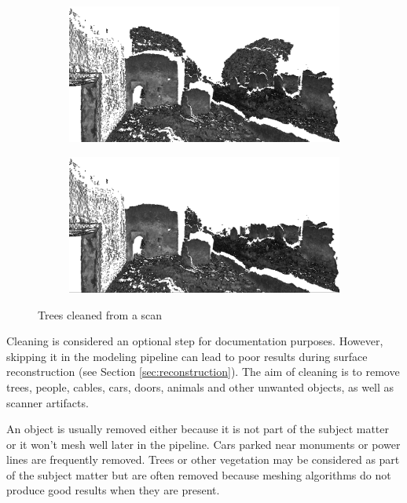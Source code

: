 \begin{figure}[ht]
	\begin{subfigure}[b]{.5\textwidth}
	  \centering
	  \includegraphics[width=.9\linewidth]{images/dirty}
	\end{subfigure}%
	\begin{subfigure}[b]{.5\textwidth}
	  \centering
	  \includegraphics[width=.9\linewidth]{images/clean}
	\end{subfigure}
  \caption{Trees cleaned from a scan}
  \label{fig:cleaning}
\end{figure}

Cleaning is considered an optional step for documentation purposes. However, skipping it in the modeling pipeline can lead to poor results during surface reconstruction (see Section \ref{sec:reconstruction}). The aim of cleaning is to remove trees, people, cables, cars, doors, animals and other unwanted objects, as well as scanner artifacts.

An object is usually removed either because it is not part of the subject matter or it won't mesh well later in the pipeline. Cars parked near monuments or power lines are frequently removed. Trees or other vegetation may be considered as part of the subject matter but are often removed because meshing algorithms do not produce good results when they are present.

